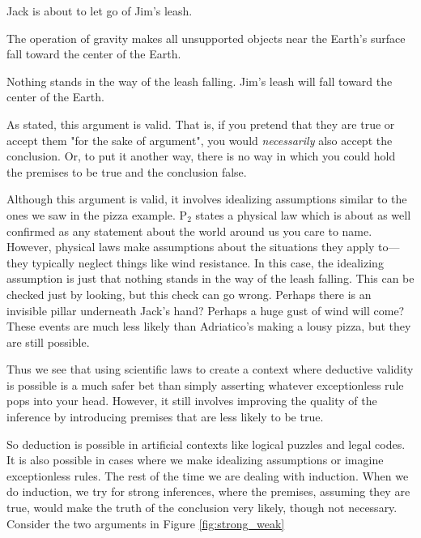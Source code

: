 \begin{adjustwidth}{2em}{2em}
\begin{earg*}
\item  Jack is about to let go of Jim's leash. 
\item  The operation of gravity makes all unsupported objects near the Earth's surface fall toward the center of the Earth. 
\item  Nothing stands in the way of the leash falling. 
\itemc  Jim's leash will fall toward the center of the Earth.
\end{earg*}
\end{adjustwidth}

As stated, this argument is valid. That is, if you pretend that they are true or accept them "for the sake of argument", you would \textit{necessarily }also accept the conclusion. Or, to put it another way, there is no way in which you could hold the premises to be true and the conclusion false.

Although this argument is valid, it involves idealizing assumptions similar to the ones we saw in the pizza example. P$_2$ states a physical law which is about as well confirmed as any statement about the world around us you care to name. However, physical laws make assumptions about the situations they apply to---they typically neglect things like wind resistance. In this case, the idealizing assumption is just that nothing stands in the way of the leash falling. This can be checked just by looking, but this check can go wrong. Perhaps there is an invisible pillar underneath Jack's hand? Perhaps a huge gust of wind will come? These events are much less likely than Adriatico's making a lousy pizza, but they are still possible. 

Thus we see that using scientific laws to create a context where deductive validity is possible is a much safer bet than simply asserting whatever exceptionless rule pops into your head. However, it still involves improving the quality of the inference by introducing premises that are less likely to be true. 

So deduction is possible in artificial contexts like logical puzzles and legal codes. It is also possible in cases where we make idealizing assumptions or imagine exceptionless rules. The rest of the time we are dealing with induction. When we do induction, we try for strong inferences, where the premises, assuming they are true, would make the truth of the conclusion very likely, though not necessary. Consider the two arguments in Figure \ref{fig:strong_weak}


